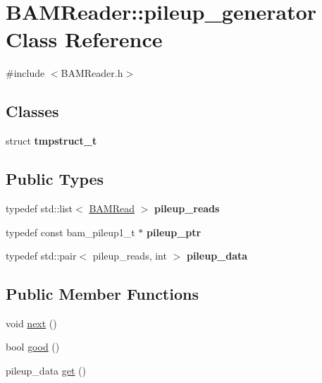 \hypertarget{class_b_a_m_reader_1_1pileup__generator}{
\section{BAMReader::pileup\_\-generator Class Reference}
\label{class_b_a_m_reader_1_1pileup__generator}
}


{\ttfamily \#include $<$BAMReader.h$>$}

\subsection*{Classes}
\begin{DoxyCompactItemize}
\item 
struct {\bfseries tmpstruct\_\-t}
\end{DoxyCompactItemize}
\subsection*{Public Types}
\begin{DoxyCompactItemize}
\item 
\hypertarget{class_b_a_m_reader_1_1pileup__generator_a6d9fb9ee5484241b1e86869021e2103e}{
typedef std::list$<$ \hyperlink{class_b_a_m_read}{BAMRead} $>$ {\bfseries pileup\_\-reads}}
\label{class_b_a_m_reader_1_1pileup__generator_a6d9fb9ee5484241b1e86869021e2103e}

\item 
\hypertarget{class_b_a_m_reader_1_1pileup__generator_a3e72f3ee7e831d1a858da4ef8ccdfd69}{
typedef const bam\_\-pileup1\_\-t $\ast$ {\bfseries pileup\_\-ptr}}
\label{class_b_a_m_reader_1_1pileup__generator_a3e72f3ee7e831d1a858da4ef8ccdfd69}

\item 
\hypertarget{class_b_a_m_reader_1_1pileup__generator_aefed21ad1afac5ea13b3647ab10bac48}{
typedef std::pair$<$ pileup\_\-reads, int $>$ {\bfseries pileup\_\-data}}
\label{class_b_a_m_reader_1_1pileup__generator_aefed21ad1afac5ea13b3647ab10bac48}

\end{DoxyCompactItemize}
\subsection*{Public Member Functions}
\begin{DoxyCompactItemize}
\item 
void \hyperlink{class_b_a_m_reader_1_1pileup__generator_a3f1130ab642fd1e02edbce5907182e83}{next} ()
\item 
bool \hyperlink{class_b_a_m_reader_1_1pileup__generator_a53d8c653b0b5aac9444ec36a8c0c791f}{good} ()
\item 
pileup\_\-data \hyperlink{class_b_a_m_reader_1_1pileup__generator_a1c7b4a224230469b00f16eb97a300103}{get} ()
\end{DoxyCompactItemize}
